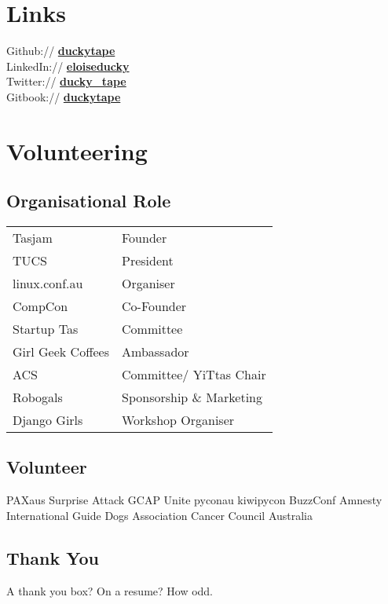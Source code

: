 \documentclass[a4paper]{deedy-resume} %
\begin{document}
\begin{minipage}[t]{0.33\textwidth} %

\section{Links}

Github:// \href{https://github.com/duckytape}{\bf duckytape} \\
LinkedIn:// \href{https://www.linkedin.com/in/eloiseducky}{\bf eloiseducky} \\
Twitter:// \href{https://twitter.com/ducky_tape}{\bf ducky\_tape}\\
Gitbook:// \href{https:duckytape.gitbooks.io//}{\bf duckytape} \\

\sectionspace %


\section{Volunteering}

\subsection{Organisational Role}
\begin{tabular}{l p{}}
Tasjam & Founder \\
TUCS & President \\
linux.conf.au & Organiser \\
CompCon & Co-Founder \\
Startup Tas & Committee \\
Girl Geek Coffees & Ambassador \\
ACS & Committee/ YiTtas Chair \\
Robogals & Sponsorship \& Marketing \\
Django Girls & Workshop Organiser \\
\end{tabular}

\sectionspace
\subsection{Volunteer} %
PAXaus \textbullet{} Surprise Attack \textbullet{} GCAP \textbullet{} Unite \textbullet{}
pyconau \textbullet{} kiwipycon \textbullet{} BuzzConf \textbullet{} Amnesty International
\textbullet{} Guide Dogs Association \textbullet{} Cancer Council Australia \\

\sectionspace %

\sectionspace
\subsection{Thank You}
A thank you box? On a resume? How odd.

\end{minipage} %
\end{document}
